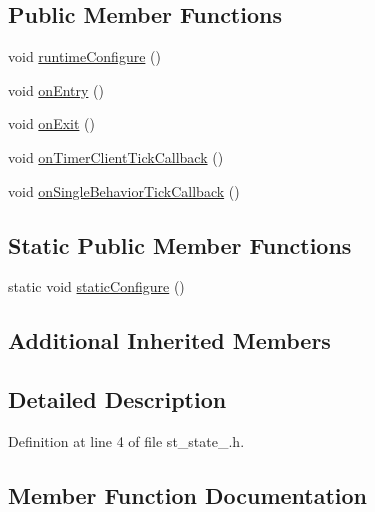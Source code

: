 \subsection*{Public Member Functions}
\begin{DoxyCompactItemize}
\item 
void \hyperlink{structsm__three__some_1_1StState4_a44ef81afd6a1ad3144fbc39c44954439}{runtime\+Configure} ()
\item 
void \hyperlink{structsm__three__some_1_1StState4_a2140ab3ca693422132501cab77efca63}{on\+Entry} ()
\item 
void \hyperlink{structsm__three__some_1_1StState4_a3479e642b294941bb91c09d211df84e7}{on\+Exit} ()
\item 
void \hyperlink{structsm__three__some_1_1StState4_a521fa5ad6ba4d239400e039a8878d541}{on\+Timer\+Client\+Tick\+Callback} ()
\item 
void \hyperlink{structsm__three__some_1_1StState4_a6e33a5af98de65274cd8ad601bc10117}{on\+Single\+Behavior\+Tick\+Callback} ()
\end{DoxyCompactItemize}
\subsection*{Static Public Member Functions}
\begin{DoxyCompactItemize}
\item 
static void \hyperlink{structsm__three__some_1_1StState4_ae244f918fa096ecbb501e25b9ca07512}{static\+Configure} ()
\end{DoxyCompactItemize}
\subsection*{Additional Inherited Members}


\subsection{Detailed Description}


Definition at line 4 of file st\+\_\+state\+\_.\+h.



\subsection{Member Function Documentation}
